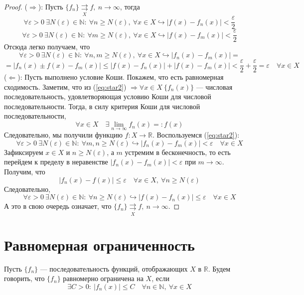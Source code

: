 \documentclass[11pt]{article}
\begin{document}
\begin{proof}
    ($\Longrightarrow$): Пусть $\{f_n\} \underset{X}{\rightrightarrows} f, \ n \to \infty$, тогда \[ \forall \varepsilon > 0 \ \exists N(\varepsilon) \in \mathbb{N}: \ \forall 
    n \geq N(\varepsilon), \ \forall x \in X \hookrightarrow |f(x) - f_n(x)| < \frac{\varepsilon}{2}\]
    \[ \forall \varepsilon > 0 \ \exists N(\varepsilon) \in \mathbb{N}: \ \forall m \geq N(\varepsilon), \ \forall x \in X \hookrightarrow |f(x) - f_m(x)| < \frac{\varepsilon}{2}\]
    Отсюда легко получаем, что \[\forall \varepsilon > 0 \ \exists N(\varepsilon) \in \mathbb{N}: \ \forall n, m \geq N(\varepsilon), \ \forall x \in X \hookrightarrow 
    |f_n(x) - f_m(x)| =\] \[= |f_n(x) \pm f(x) - f_m(x)| \leq |f(x) - f_n(x)| + |f(x) - f_m(x)| < \frac{\varepsilon}{2} + \frac{\varepsilon}{2} = \varepsilon \quad \forall x \in X\] 
    ($\Longleftarrow$): Пусть выполнено условие Коши. Покажем, что есть равномерная сходимость. Заметим, что из (\ref{eq:star2}) $\Longrightarrow \forall x \in X \ \{f_n(x)\}$ ---
    числовая последовательность, удовлетворяющая условию Коши для числовой последовательности. Тогда, в силу критерия Коши для числовой последовательности, \[ \forall x \in X \quad \exists \lim_{n \to \infty}
    f_n(x) =: f(x)\] Следовательно, мы получили функцию $f: X \to \mathbb{R}$. Воспользуемся (\ref{eq:star2}):
    \[\forall \varepsilon > 0 \ \exists N(\varepsilon) \in \mathbb{N}: \ \forall m, n \geq N(\varepsilon) \hookrightarrow |f_n(x) - f_m(x)| < \varepsilon \quad \forall x \in X\]
    Зафиксируем $x \in X$ и $n \geq N(\varepsilon)$, а $m$ устремим в бесконечность, то есть перейдем к пределу в неравенстве $|f_n(x) - f_m(x)| < \varepsilon$
    при $m \to \infty$. Получим, что \[|f_n(x) - f(x)| \leq \varepsilon \quad \forall x \in X, \ \forall n \geq N(\varepsilon)\] Следовательно, \[ \forall \varepsilon > 0 \ \exists
    N(\varepsilon) \in \mathbb{N}: \ \forall n \geq N(\varepsilon) \hookrightarrow |f(x) - f_n(x)| \leq \varepsilon \quad \forall x \in X\] А это в свою очередь означает, что 
    $\{f_n\} \underset{X}{\rightrightarrows} f, \ n \to \infty$.
\end{proof}

\section{Равномерная ограниченность}

\begin{definition}
    Пусть $\{f_n\}$ --- последовательность функций, отображающих $X$ в $\mathbb{R}$. Будем говорить, что $\{f_n\}$ равномерно ограничена на $X$, если 
    \[\exists C > 0: \ |f_n(x)| \leq C \quad \forall n \in \mathbb{N}, \ \forall x \in X\]
\end{definition}
\end{document}
